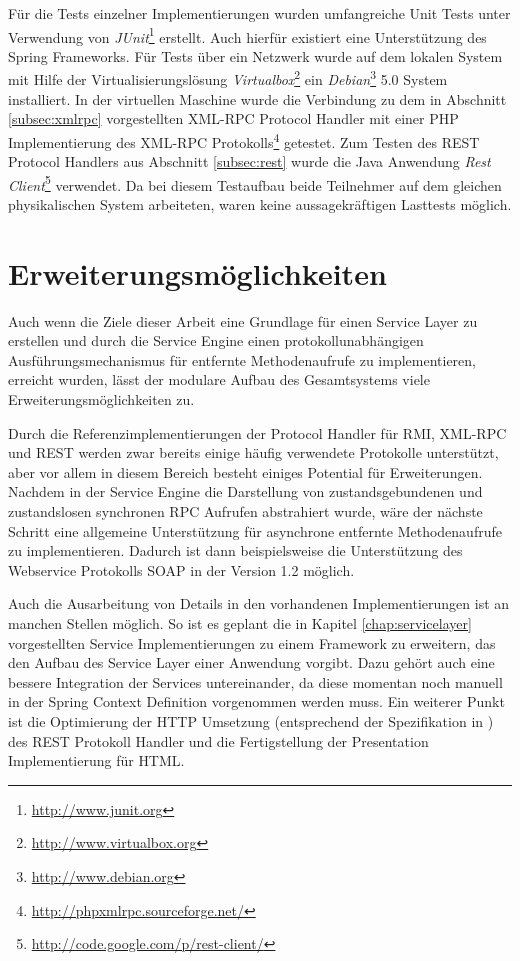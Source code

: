 Für die Tests einzelner Implementierungen wurden umfangreiche Unit Tests unter
Verwendung von \emph{JUnit}\footnote{\url{http://www.junit.org}} erstellt. Auch
hierfür existiert eine Unterstützung des Spring Frameworks. Für Tests über ein
Netzwerk wurde auf dem lokalen System mit Hilfe der Virtualisierungslösung
\emph{Virtualbox}\footnote{\url{http://www.virtualbox.org}} ein
\emph{Debian}\footnote{\url{http://www.debian.org}} 5.0 System installiert. In
der virtuellen Maschine wurde die Verbindung zu dem in Abschnitt
\ref{subsec:xmlrpc} vorgestellten XML-RPC Protocol Handler mit einer PHP
Implementierung des XML-RPC
Protokolls\footnote{\url{http://phpxmlrpc.sourceforge.net/}} getestet. Zum Testen
des \ac{REST} Protocol Handlers aus Abschnitt \ref{subsec:rest} wurde die Java
Anwendung \emph{Rest
Client}\footnote{\url{http://code.google.com/p/rest-client/}} verwendet. Da bei
diesem Testaufbau beide Teilnehmer auf dem gleichen physikalischen System
arbeiteten, waren keine aussagekräftigen Lasttests möglich.

\section{Erweiterungsm\"oglichkeiten} 
Auch wenn die Ziele dieser Arbeit eine Grundlage für einen Service Layer zu
erstellen und durch die Service Engine einen protokollunabhängigen
Ausführungsmechanismus für entfernte Methodenaufrufe zu implementieren, erreicht
wurden, lässt der modulare Aufbau des Gesamtsystems viele
Erweiterungsmöglichkeiten zu.

Durch die Referenzimplementierungen der Protocol Handler für \ac{RMI}, XML-RPC
und \ac{REST} werden zwar bereits einige häufig verwendete Protokolle
unterstützt, aber vor allem in diesem Bereich besteht einiges Potential für
Erweiterungen. Nachdem in der Service Engine die Darstellung von
zustandsgebundenen und zustandslosen synchronen \ac{RPC} Aufrufen abstrahiert
wurde, wäre der nächste Schritt eine allgemeine Unterstützung für asynchrone
entfernte Methodenaufrufe zu implementieren. Dadurch ist dann beispielsweise
die Unterstützung des Webservice Protokolls SOAP in der Version 1.2 möglich.

Auch die Ausarbeitung von Details in den vorhandenen Implementierungen ist an
manchen Stellen möglich. So ist es geplant die in Kapitel \ref{chap:servicelayer}
vorgestellten Service Implementierungen zu einem Framework zu erweitern, das den
Aufbau des Service Layer einer Anwendung vorgibt. Dazu gehört auch eine bessere
Integration der Services untereinander, da diese momentan noch manuell in der
Spring Context Definition vorgenommen werden muss. Ein weiterer Punkt ist die
Optimierung der \ac{HTTP} Umsetzung (entsprechend der Spezifikation in
\cite{rfc2616}) des \ac{REST} Protokoll Handler und die Fertigstellung der
Presentation Implementierung für \ac{HTML}.


